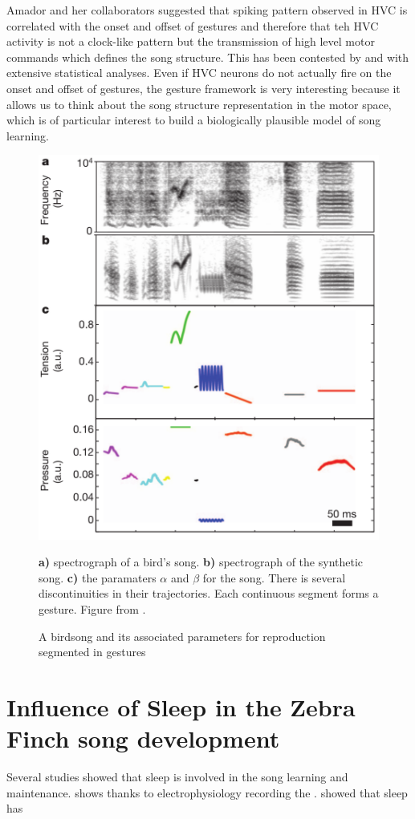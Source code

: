 \documentclass{report}
\begin{document}
Amador and her collaborators suggested that spiking pattern observed
in HVC is correlated with the onset and offset of gestures and therefore that
teh HVC activity is not a clock-like pattern but the transmission of high level
motor commands which defines the song structure. This has been contested by
\textcite{lynch_rhythmic_2016} and \textcite{picardo_population-level_2016} with
extensive statistical analyses. Even if HVC neurons do not actually fire on the
onset and offset of gestures, the gesture framework is very interesting because
it allows us to think about the song structure representation in the motor
space, which is of particular interest to build a biologically plausible model
of song learning.

\begin{figure}[htbp]
  {\center
  \includegraphics[width=0.5\linewidth]{media/gesture_schema_amador}
  \caption{A birdsong and its associated parameters for reproduction segmented
  in gestures\label{gestures_schema}}}

  \small
  \textbf{a)} spectrograph of a bird's song. \textbf{b)} spectrograph of the
  synthetic song. \textbf{c)} the paramaters \(\alpha\) and \(\beta\) for the
  song. There is several discontinuities in their trajectories. Each continuous
  segment forms a gesture. Figure from \textcite{amador_elemental_2013}.

\end{figure}

\section{Influence of Sleep in the Zebra Finch song development}
\label{influence-of-sleep-in-the-zebra-finch-song-development}

Several studies showed that sleep is involved in the song learning and
maintenance. \textcite{dave_song_2000} shows thanks to electrophysiology
recording the . \textcite{deregnaucourt_how_2005} showed that sleep has 
\end{document}
